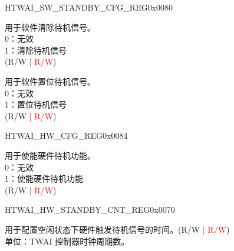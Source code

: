 \begin{register}{H}{TWAI\_SW\_STANDBY\_CFG\_REG}{0x0080}\label{regdesc:TWAISWSTANDBYCFGREG}
%
%
%
\regnewline%
\begin{regdesc}\begin{reglist}
\label{fielddesc:TWAISWSTANDBYCLR}\item [TWAI\_SW\_STANDBY\_CLR] 用于软件清除待机信号。\\
0：无效\\
1：清除待机信号 \\(R/W \textcolor{red}{| R/W})
\label{fielddesc:TWAISWSTANDBYEN}\item [TWAI\_SW\_STANDBY\_EN] 用于软件置位待机信号。\\
0：无效\\
1：置位待机信号 \\
(R/W \textcolor{red}{| R/W})
\end{reglist}\end{regdesc}
\end{register}


\begin{register}{H}{TWAI\_HW\_CFG\_REG}{0x0084}\label{regdesc:TWAIHWCFGREG}
%
%
\regnewline%
\begin{regdesc}\begin{reglist}
\label{fielddesc:TWAIHWSTANDBYEN}\item [TWAI\_HW\_STANDBY\_EN] 用于使能硬件待机功能。\\
0：无效\\
1：使能硬件待机功能\\
(R/W \textcolor{red}{| R/W})
\end{reglist}\end{regdesc}
\end{register}


\begin{register}{H}{TWAI\_HW\_STANDBY\_CNT\_REG}{0x0070}\label{regdesc:TWAIHWSTANDBYCNTREG}
%
\regnewline%
\begin{regdesc}\begin{reglist}
\label{fielddesc:TWAISTANDBYWAITCNT}\item [TWAI\_STANDBY\_WAIT\_CNT] 用于配置空闲状态下硬件触发待机信号的时间。(R/W \textcolor{red}{| R/W})\\
单位：TWAI 控制器时钟周期数。
\end{reglist}\end{regdesc}
\end{register}


